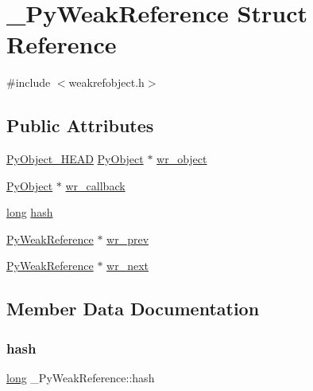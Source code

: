 \hypertarget{struct___py_weak_reference}{}\section{\+\_\+\+Py\+Weak\+Reference Struct Reference}
\label{struct___py_weak_reference}


{\ttfamily \#include $<$weakrefobject.\+h$>$}

\subsection*{Public Attributes}
\begin{DoxyCompactItemize}
\item 
\mbox{\hyperlink{_python27_2object_8h_a0bf35c1f3ea13f925de94d8593db3b7e}{Py\+Object\+\_\+\+H\+E\+AD}} \mbox{\hyperlink{_python27_2object_8h_aadc84ac7aed2cfa6f20c25f62bf3dac7}{Py\+Object}} $\ast$ \mbox{\hyperlink{struct___py_weak_reference_a7a8c9bd3258c64957e04f9104268ae88}{wr\+\_\+object}}
\item 
\mbox{\hyperlink{_python27_2object_8h_aadc84ac7aed2cfa6f20c25f62bf3dac7}{Py\+Object}} $\ast$ \mbox{\hyperlink{struct___py_weak_reference_a29e417c1f334eae9241f47b20c4749b4}{wr\+\_\+callback}}
\item 
\mbox{\hyperlink{modsupport_8h_a0cb68e00fb9fb1260ee2daadd9fe6611}{long}} \mbox{\hyperlink{struct___py_weak_reference_aef59618cee0c531179f7e003fe1f2303}{hash}}
\item 
\mbox{\hyperlink{weakrefobject_8h_a7d8920320e9b260a1cab32ab0380add2}{Py\+Weak\+Reference}} $\ast$ \mbox{\hyperlink{struct___py_weak_reference_a437c4c0b40ca4b8c011795c49351eacd}{wr\+\_\+prev}}
\item 
\mbox{\hyperlink{weakrefobject_8h_a7d8920320e9b260a1cab32ab0380add2}{Py\+Weak\+Reference}} $\ast$ \mbox{\hyperlink{struct___py_weak_reference_ac301935218d7aebcf18f107ca4f1b894}{wr\+\_\+next}}
\end{DoxyCompactItemize}


\subsection{Member Data Documentation}
\mbox{\label{struct___py_weak_reference_aef59618cee0c531179f7e003fe1f2303}} 
\subsubsection{\texorpdfstring{hash}{hash}}
{\footnotesize\ttfamily \mbox{\hyperlink{modsupport_8h_a0cb68e00fb9fb1260ee2daadd9fe6611}{long}} \+\_\+\+Py\+Weak\+Reference\+::hash}

